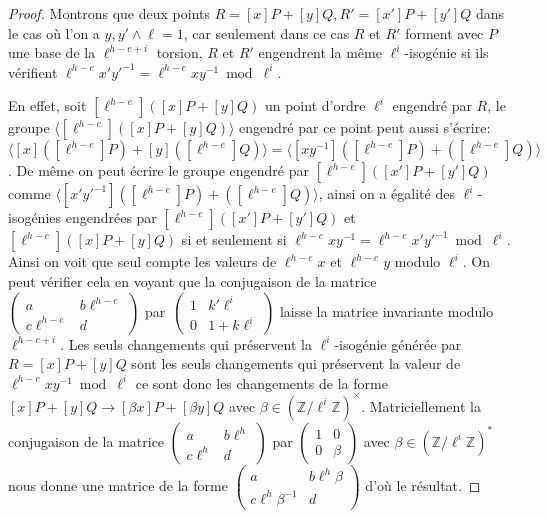 \documentclass[10pt,a4paper]{book}
\theoremstyle{plain}
\theoremstyle{definition}
\theoremstyle{definition}
\theoremstyle{definition}
\theoremstyle{definition}
\theoremstyle{remark}
\theoremstyle{remark}
\theoremstyle{definition}
\begin{document}
\begin{proof}
Montrons que deux points $R=[x]P+[y]Q,R'=[x']P+[y']Q$ dans le cas où l'on a 
$y,y' \wedge \ell=1$, car seulement dans ce cas $R$ et $R'$ forment avec $P$ 
une base de la $\ell^{h-e+i}$ torsion, $R$ et $R'$ engendrent la même 
$\ell^i$-isogénie si ils vérifient $\ell^{h-e}x'y'^{-1}=\ell^{h-e}xy^{-1} 
\bmod \ell^{i}$.

En effet, soit $[\ell^{h-e}]([x]P+[y]Q)$ un point d'ordre $\ell^i$ engendré par $R$, 
le groupe $\langle [\ell^{h-e}]([x]P+[y]Q) \rangle$ engendré par ce point peut 
aussi s'écrire:$\langle [x]([\ell^{h-e}]P)+ [y]([\ell^{h-e}]Q) \rangle=\langle 
[xy^{-1}]([\ell^{h-e}]P)+ ([\ell^{h-e}]Q) \rangle$. De même on peut écrire le 
groupe engendré par $[\ell^{h-e}]([x']P+[y']Q)$ comme $\langle [x'y'^{-1}]
([\ell^{h-e}]P)+ ([\ell^{h-e}]Q) \rangle$, ainsi on a égalité des 
$\ell^i$-isogénies engendrées par $[\ell^{h-e}]([x']P+[y']Q)$ et 
$[\ell^{h-e}]([x]P+[y]Q)$ si et seulement si $\ell^{h-e}xy^{-1}=\ell^{h-e}
x'y'^{-1}\bmod \ell^{i}$. Ainsi on voit que seul compte les valeurs de 
$\ell^{h-e}x$ et $\ell^{h-e}y$ modulo $\ell^i$.
On peut vérifier cela en voyant que la conjugaison de la matrice 
$\left ( \begin{smallmatrix}a & b\ell^{h-e}\\c\ell^{h-e} & d
\end{smallmatrix}\right )$ par~$\left ( \begin{smallmatrix}1 & k' \ell^i \\
0 & 1 + k \ell^i \end{smallmatrix} \right )$  laisse la matrice invariante 
modulo $\ell^{h-e+i}$. 
Les seuls changements qui préservent la $\ell^i$-isogénie générée par 
$R=[x]P+[y]Q$ sont les seuls changements qui préservent la valeur de 
$\ell^{h-e}xy^{-1} \bmod \ell^{i}$ ce sont donc les changements de la forme 
$[x]P+[y]Q \rightarrow [\beta x]P+[\beta y]Q$ avec $\beta \in \left( \mathbb{Z}
/\ell^i\mathbb{Z} \right)^{\times}$. Matriciellement la conjugaison de la
matrice $\left( \begin{smallmatrix}a & b \ell^h \\c  \ell^{h} & d 
\end{smallmatrix} \right)$ par $\left( \begin{smallmatrix}1 & 0 \\0
& \beta \end{smallmatrix} \right)$ avec $\beta \in \left( \mathbb{Z}/\ell^{i}
\mathbb{Z}\right)^*$ nous donne une matrice de la forme 
$\left( \begin{smallmatrix}a & b \ell^h \beta \\c \ell^{h} \beta^{-1} &
 d \end{smallmatrix} \right)$ d'où le résultat.
\end{proof}
\end{document}
